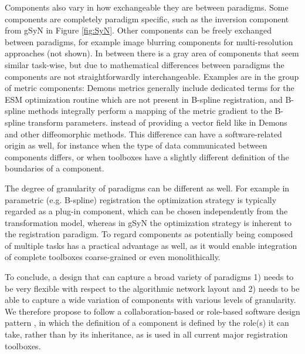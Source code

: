 Components also vary in how exchangeable they are between paradigms.
Some components are completely paradigm specific, such as the inversion component from gSyN in Figure \ref{fig:SyN}. Other
components can be freely exchanged between paradigms, for example
image blurring components for multi-resolution approaches (not shown). In between there is a gray area of components
that seem similar task-wise, but due to mathematical differences
between paradigms the components are not straightforwardly
interchangeable.
Examples are in the group of metric components: Demons metrics generally include dedicated terms for the ESM optimization routine which are not present in B-spline registration, and B-spline methods integrally perform a mapping of the metric gradient to the B-spline transform parameters.
instead of providing a vector field like in Demons and other diffeomorphic methods.
This difference can have a
software-related origin as well, for instance when the type of data
communicated between components differs, or when toolboxes have a slightly different definition of the boundaries of a component.

The degree of granularity of paradigms can be different as well.
For example in parametric (e.g. B-spline) registration the optimization strategy is typically regarded as a plug-in component, which can be chosen independently from the transformation model, whereas in gSyN the optimization strategy is inherent to the registration paradigm.
To regard components as potentially being composed of multiple tasks has a practical advantage as well, as it would enable
integration of complete toolboxes coarse-grained or even monolithically.

To conclude, a design that can capture a broad variety of paradigms
1) needs to be very flexible with respect to the algorithmic network
layout and 2) needs to be able to capture a wide variation 
of components with various levels of granularity. We therefore propose to follow a
collaboration-based or role-based software design pattern
\cite{Smaragdakis:Mixin}, in which the definition of a component is
defined by the role(s) it can take, rather than by its inheritance,
as is used in all current major registration toolboxes.
